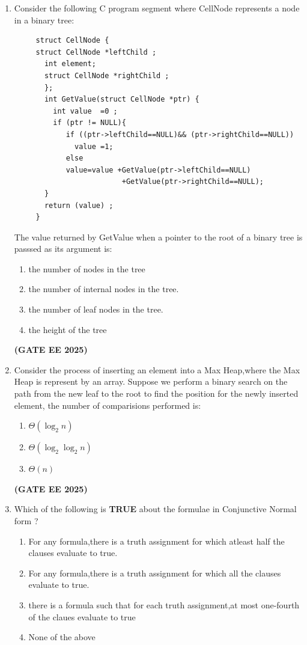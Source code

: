 \documentclass[journal,12pt,onecolumn]{IEEEtran}
\theoremstyle{remark}
\begin{document}
\begin{enumerate}
 \item Consider the following C program segment where CellNode represents a node in a binary tree:
 \begin{verbatim}
     struct CellNode {
     struct CellNode *leftChild ;
       int element;
       struct CellNode *rightChild ;
       };
       int GetValue(struct CellNode *ptr) {
         int value  =0 ;
         if (ptr != NULL){
            if ((ptr->leftChild==NULL)&& (ptr->rightChild==NULL))
              value =1;
            else 
            value=value +GetValue(ptr->leftChild==NULL)
                         +GetValue(ptr->rightChild==NULL);
       }
       return (value) ;
     }
 \end{verbatim}
 The value returned by GetValue when a pointer to the root of a binary tree is passsed as its argument is:
 \begin{enumerate}
     \item  the number of nodes in the tree
     \item the number of internal nodes in the tree.
     \item the number of leaf nodes in the tree.
     \item the height of the tree
 \end{enumerate}
 \hfill \textbf{(GATE EE 2025)}
 \item Consider the process of inserting an element into a Max Heap,where the Max Heap is represent by an array. Suppose we perform a binary search on the path from the new leaf to the root to find the position for the newly inserted  element, the number of comparisions performed is:
 \begin{enumerate}
 \item $\Theta(\log_2 n)$
    \item $\Theta(\log_2 \log_2 n)$
    \item $\Theta(n)$
 \end{enumerate}
 \hfill \textbf{(GATE EE 2025)}
 \item Which of the following is \textbf{TRUE} about the formulae in Conjunctive Normal form ?
 \begin{enumerate}
     \item For any formula,there is a truth assignment for which atleast half the clauses evaluate to true.
     \item For any formula,there is a truth assignment for which all the clauses evaluate to true.
     \item there is a formula such that for each truth assignment,at most one-fourth of the claues evaluate to true
     \item None of the above
     

\end{enumerate}
\end{enumerate}
\end{document}
